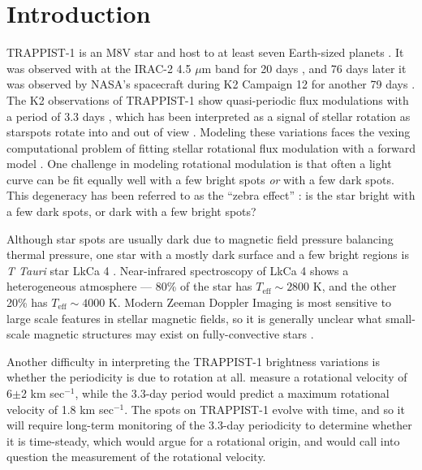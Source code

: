 

\section{Introduction}

TRAPPIST-1 is an M8V star and host to at least seven Earth-sized planets \citep{Gillon2016,Gillon2017}. It was observed with \spitzer at the IRAC-2 4.5 $\mu$m band for 20 days \citep{Gillon2017,Delrez2018}, and 76 days later it was observed by NASA's \kepler spacecraft during K2 Campaign 12 for another 79 days \citet{luger2017everest}.  The K2 observations of TRAPPIST-1 show quasi-periodic flux modulations with a period of 3.3 days \citep{Luger2017, Delrez2018}, which has been interpreted as a signal of stellar rotation as starspots rotate into and out of view \citep{Vida2017}.  Modeling these variations faces the vexing computational problem of fitting stellar rotational flux modulation with a forward model \citep{Aigrain2015, Davenport2015}. One challenge in modeling rotational modulation is that often a light curve can be fit equally well with a few bright spots \textit{or} with a few dark spots. This degeneracy has been referred to as the ``zebra effect''  \citep{Pettersen1992}: is the star bright with a few dark spots, or dark with a few bright spots?

Although star spots are usually dark due to magnetic field pressure balancing thermal pressure, one star with a mostly dark surface and a few bright regions is \textit{T Tauri} star LkCa 4 \citep{Gully2017}. Near-infrared spectroscopy of LkCa 4 shows a heterogeneous atmosphere --- 80\%  of the star has $T_{\mathrm{eff}} \sim 2800$ K, and the other 20\% has $T_{\mathrm{eff}} \sim 4000$ K. Modern Zeeman Doppler Imaging is most sensitive to large scale features in stellar magnetic fields, so it is generally unclear what small-scale magnetic structures may exist on fully-convective stars \citep[see e.g.~][]{Morin2013}.

Another difficulty in interpreting the TRAPPIST-1 brightness variations is whether the periodicity is due to rotation at all.  \cite{Reiners2010} measure a rotational velocity of 6$\pm$2 km sec$^{-1}$, while the 3.3-day period would predict a maximum rotational velocity of 1.8 km sec$^{-1}$.  The spots on TRAPPIST-1 evolve with time, and so it will require long-term monitoring of the 3.3-day periodicity to determine whether it is time-steady, which would argue for a rotational origin, and would call into question the measurement of the rotational velocity.

